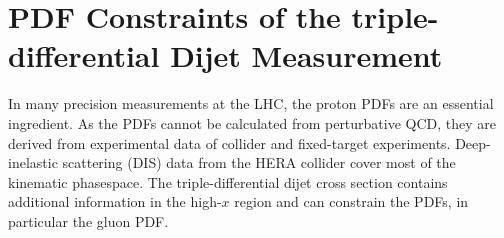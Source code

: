 
\chapter{PDF Constraints of the triple-differential Dijet Measurement}

In many precision measurements at the LHC, the proton PDFs are an essential
ingredient. As the PDFs cannot be calculated from perturbative QCD, they are
derived from experimental data of collider and fixed-target experiments.
Deep-inelastic scattering (DIS) data from the HERA collider cover most of the
kinematic phasespace. The triple-differential dijet cross section contains
additional information in the high-$x$ region and can constrain the PDFs, in
particular the gluon PDF. 





